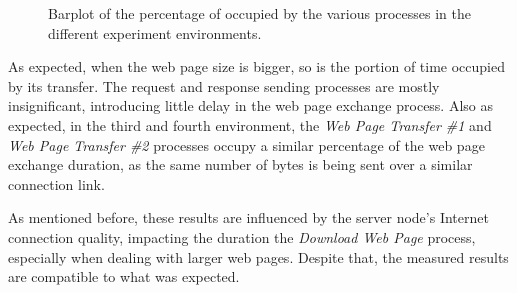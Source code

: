 \begin{figure}[ht]
	\noindent{}
	\caption{\label{fig:perctime} Barplot of the percentage of occupied by the various processes in the different experiment environments.}
\end{figure}

As expected, when the web page size is bigger, so is the portion of time occupied by its transfer. The request and response sending processes are mostly insignificant, introducing little delay in the web page exchange process. Also as expected, in the third and fourth environment, the \textit{Web Page Transfer \#1} and \textit{Web Page Transfer \#2} processes occupy a similar percentage of the web page exchange duration, as the same number of bytes is being sent over a similar connection link.

As mentioned before, these results are influenced by the server node's Internet connection quality, impacting the duration the \textit{Download Web Page} process, especially when dealing with larger web pages. Despite that, the measured results are compatible to what was expected.




